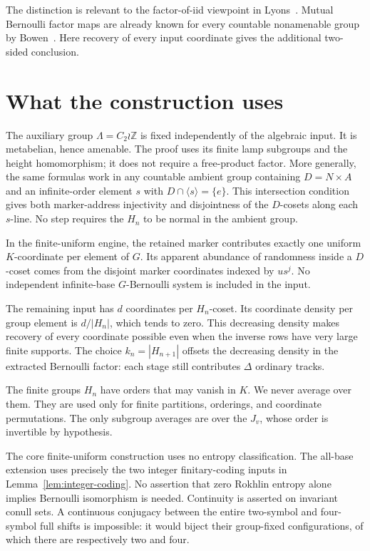 \documentclass[11pt,a4paper]{article}
\numberwithin{equation}{section}
\newcommand{\ZZ}{\mathbb Z}
\begin{document}
The distinction is relevant to the factor-of-iid viewpoint in
Lyons~\cite{Lyons}. Mutual Bernoulli factor maps are already known
for every countable nonamenable group by Bowen~\cite{Bowen}.
Here recovery of every input coordinate gives the additional
two-sided conclusion.

\section{What the construction uses}\label{sec:scope}

The auxiliary group $\Lambda=C_2\wr\ZZ$ is fixed independently of the
algebraic input. It is metabelian, hence amenable. The proof uses its
finite lamp subgroups and the height homomorphism; it does not require
a free-product factor. More generally, the same formulas work in any
countable ambient group containing $D=N\times A$ and an infinite-order
element $s$ with $D\cap\langle s\rangle=\{e\}$. This intersection condition
gives both marker-address injectivity and disjointness of the $D$-cosets
along each $s$-line. No step requires the $H_n$ to be normal in the
ambient group.

In the finite-uniform engine, the retained marker contributes exactly
one uniform $K$-coordinate per element of $G$. Its apparent abundance
of randomness inside a $D$-coset
comes from the disjoint marker coordinates indexed by $us^j$.
No independent infinite-base $G$-Bernoulli system is included in the
input.

The remaining input has $d$ coordinates per $H_n$-coset. Its coordinate
density per group element is $d/|H_n|$, which tends to zero. This
decreasing density makes recovery of every coordinate possible even when the inverse
rows have very large finite supports. The choice $k_n=|H_{n+1}|$ offsets
the decreasing density in the extracted Bernoulli factor: each stage
still contributes $\Delta$ ordinary tracks.

The finite groups $H_n$ have orders that may vanish in $K$. We never
average over them. They are used only for finite partitions, orderings,
and coordinate permutations. The only subgroup averages are over the
$J_v$, whose order is invertible by hypothesis.

The core finite-uniform construction uses no entropy classification.
The all-base extension uses precisely the two integer finitary-coding
inputs in Lemma~\ref{lem:integer-coding}. No assertion that zero
Rokhlin entropy alone implies Bernoulli isomorphism is needed.
Continuity is asserted on invariant conull sets. A continuous
conjugacy between the entire two-symbol and four-symbol full shifts
is impossible: it would biject their group-fixed configurations,
of which there are respectively two and four.
\end{document}
